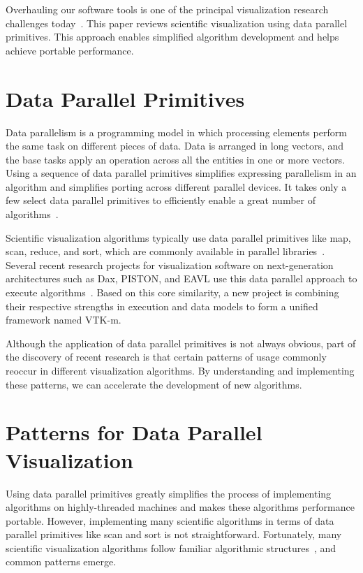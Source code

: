 \documentclass{superfri}
\newcommand*{\lcite}[1]{~\cite{#1}}
\begin{document}
Overhauling our software tools is one of the principal visualization
research challenges today\lcite{Childs2013}. This paper reviews scientific
visualization using data parallel primitives. This approach enables
simplified algorithm development and helps achieve portable performance.


\section{Data Parallel Primitives}

\noindent
Data parallelism is a programming model in which processing elements
perform the same task on different pieces of data. Data is arranged in long
vectors, and the base tasks apply an operation across all the entities in
one or more vectors. Using a sequence of data parallel primitives
simplifies expressing parallelism in an algorithm and simplifies porting
across different parallel devices. It takes only a few select data parallel
primitives to efficiently enable a great number of
algorithms\lcite{Blelloch1990}.

Scientific visualization algorithms typically use data parallel primitives
like map, scan, reduce, and sort, which are commonly available in parallel
libraries\lcite{Thrust,TBB}. Several recent research projects for
visualization software on next-generation architectures such as Dax,
PISTON, and EAVL use this data parallel approach to execute
algorithms\lcite{Sewell2012}. Based on this core similarity, a new project
is combining their respective strengths in execution and data models to
form a unified framework named VTK-m.

Although the application of data parallel primitives is not always obvious,
part of the discovery of recent research is that certain patterns of usage
commonly reoccur in different visualization algorithms. By understanding
and implementing these patterns, we can accelerate the development of new
algorithms.


\section{Patterns for Data Parallel Visualization}

\noindent
Using data parallel primitives greatly simplifies the process of
implementing algorithms on highly-threaded machines and makes these
algorithms performance portable. However, implementing many scientific
algorithms in terms of data parallel primitives like scan and sort is not
straightforward. Fortunately, many scientific visualization algorithms
follow familiar algorithmic structures\lcite{Moreland2013:UltraVis}, and
common patterns emerge.
\end{document}
